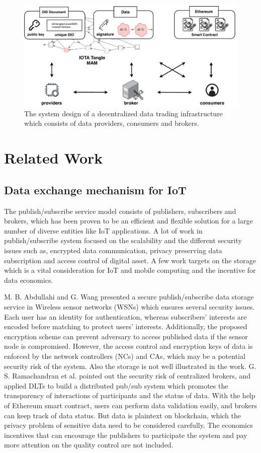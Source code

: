 \documentclass[conference]{IEEEtran}
\begin{document}
\begin{figure}[!t]
    \centering
    \includegraphics[width=3.in]{system_design}
    \caption{The system design of a decentralized data trading infrastructure which consists of data providers, consumers and brokers.}
    \label{fig:system_design}
\end{figure}

\section{Related Work}
\label{section:relatedWork}
\subsection{Data exchange mechanism for IoT}
The publish/subscribe service model consists of publishers, subscribers and brokers, which has been proven\cite{pubSubAnalysis, pubSubAnalysis2} to be an efficient and flexible solution for a large number of diverse entities like IoT applications. A lot of work in publish/subscribe system focused on the scalability and the different security issues such as, encrypted data communication, privacy preserving data subscription and access control of digital asset. A few work targets on the storage which is a vital consideration for IoT and mobile computing and the incentive for data economics.

M. B. Abdullahi and G. Wang\cite{centralPubSub} presented a secure publish/subscribe data storage service in Wireless sensor networks (WSNs) which ensures several security issues. Each user has an identity for authentication, whereas subscribers' interests are encoded before matching to protect users' interests. Additionally, the proposed encryption scheme can prevent adversary to access published data if the sensor node is compromised. However, the access control and encryption keys of data is enforced by the network controllers (NCs) and CAs, which may be a potential security risk of the system. Also the storage is not well illustrated in the work. G. S. Ramachandran et al.\cite{trinity} pointed out the security risk of centralized brokers, and applied DLTs to build a distributed pub/sub system which promotes the transparency of interactions of participants and the status of data. With the help of Ethereum smart contract, users can perform data validation easily, and brokers can keep track of data status. But data is plaintext on blockchain, which the privacy problem of sensitive data need to be considered carefully. The economics incentives that can encourage the publishers to participate the system and pay more attention on the quality control are not included.
\end{document}
